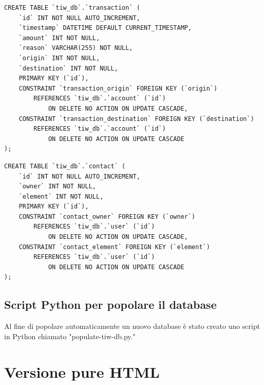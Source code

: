 \documentclass{article}
\begin{document}
\begin{verbatim}
CREATE TABLE `tiw_db`.`transaction` (
	`id` INT NOT NULL AUTO_INCREMENT,
	`timestamp` DATETIME DEFAULT CURRENT_TIMESTAMP,
	`amount` INT NOT NULL,
	`reason` VARCHAR(255) NOT NULL,
	`origin` INT NOT NULL,
	`destination` INT NOT NULL,
	PRIMARY KEY (`id`),
	CONSTRAINT `transaction_origin` FOREIGN KEY (`origin`) 
		REFERENCES `tiw_db`.`account` (`id`)
			ON DELETE NO ACTION ON UPDATE CASCADE,
	CONSTRAINT `transaction_destination` FOREIGN KEY (`destination`) 
		REFERENCES `tiw_db`.`account` (`id`) 
			ON DELETE NO ACTION ON UPDATE CASCADE
);
\end{verbatim}

\begin{verbatim}
CREATE TABLE `tiw_db`.`contact` (
	`id` INT NOT NULL AUTO_INCREMENT,
	`owner` INT NOT NULL,
	`element` INT NOT NULL,
	PRIMARY KEY (`id`),
	CONSTRAINT `contact_owner` FOREIGN KEY (`owner`) 
		REFERENCES `tiw_db`.`user` (`id`)
			ON DELETE NO ACTION ON UPDATE CASCADE,
	CONSTRAINT `contact_element` FOREIGN KEY (`element`) 
		REFERENCES `tiw_db`.`user` (`id`) 
			ON DELETE NO ACTION ON UPDATE CASCADE
);
\end{verbatim}

\subsection{Script Python per popolare il database}
Al fine di popolare automaticamente un nuovo database è stato creato uno script in Python chiamato "populate-tiw-db.py." 

\section{Versione pure HTML}
\end{document}
